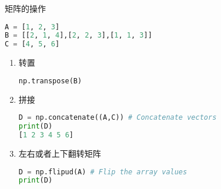 矩阵的操作
\begin{lstlisting}[language=python]
A = [1, 2, 3]
B = [[2, 1, 4],[2, 2, 3],[1, 1, 3]]
C = [4, 5, 6]
\end{lstlisting}
\begin{enumerate}
\item 转置
\begin{lstlisting}[language=python]
np.transpose(B)
\end{lstlisting}
\item 拼接
\begin{lstlisting}[language=python]
D = np.concatenate((A,C)) # Concatenate vectors
print(D)
[1 2 3 4 5 6]
\end{lstlisting}
\item 左右或者上下翻转矩阵
\begin{lstlisting}[language=python]
D = np.flipud(A) # Flip the array values
print(D)

\end{lstlisting}
\end{enumerate}


